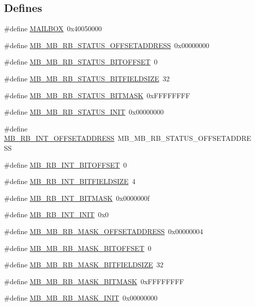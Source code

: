 \subsection*{Defines}
\begin{DoxyCompactItemize}
\item 
\#define \hyperlink{a00562_aec191881c194bbd41398484be819f3f2}{MAILBOX}~0x40050000
\item 
\#define \hyperlink{a00562_a016e3fc97e745927a8e4988dbf686809}{MB\_\-MB\_\-RB\_\-STATUS\_\-OFFSETADDRESS}~0x00000000
\item 
\#define \hyperlink{a00562_ace1cd2db5cab4873a9cac82d8118f1ff}{MB\_\-MB\_\-RB\_\-STATUS\_\-BITOFFSET}~0
\item 
\#define \hyperlink{a00562_a5b92f9745f3c6cc22f2f05050045f194}{MB\_\-MB\_\-RB\_\-STATUS\_\-BITFIELDSIZE}~32
\item 
\#define \hyperlink{a00562_a5896996a4d843251872e78064f2545c6}{MB\_\-MB\_\-RB\_\-STATUS\_\-BITMASK}~0xFFFFFFFF
\item 
\#define \hyperlink{a00562_a35f893b19cc32b14877fd398364dac68}{MB\_\-MB\_\-RB\_\-STATUS\_\-INIT}~0x00000000
\item 
\#define \hyperlink{a00562_a5d5a6e6093f1918d4912dab9e59587ce}{MB\_\-RB\_\-INT\_\-OFFSETADDRESS}~MB\_\-MB\_\-RB\_\-STATUS\_\-OFFSETADDRESS
\item 
\#define \hyperlink{a00562_a8cda520fdf27d64c2d05e48bda836f13}{MB\_\-RB\_\-INT\_\-BITOFFSET}~0
\item 
\#define \hyperlink{a00562_ab631f7c502b0888aad4f38c1d9f0347a}{MB\_\-RB\_\-INT\_\-BITFIELDSIZE}~4
\item 
\#define \hyperlink{a00562_a0266c9edf244f9ffa89a11e1272b38c9}{MB\_\-RB\_\-INT\_\-BITMASK}~0x0000000f
\item 
\#define \hyperlink{a00562_ac941645f19586ff157b674af71de443f}{MB\_\-RB\_\-INT\_\-INIT}~0x0
\item 
\#define \hyperlink{a00562_ac3530909b0997f6db0c1f9ca6efb6ac5}{MB\_\-MB\_\-RB\_\-MASK\_\-OFFSETADDRESS}~0x00000004
\item 
\#define \hyperlink{a00562_adc962ec4ed6e07508c4bb1bf9e56a932}{MB\_\-MB\_\-RB\_\-MASK\_\-BITOFFSET}~0
\item 
\#define \hyperlink{a00562_ad1c78fd5c3e9172bb30064042ee2d055}{MB\_\-MB\_\-RB\_\-MASK\_\-BITFIELDSIZE}~32
\item 
\#define \hyperlink{a00562_a0c02b645113d43765676d4c2852d9c7c}{MB\_\-MB\_\-RB\_\-MASK\_\-BITMASK}~0xFFFFFFFF
\item 
\#define \hyperlink{a00562_a5225729f954beddb3c2c5335bcfc9ec5}{MB\_\-MB\_\-RB\_\-MASK\_\-INIT}~0x00000000

\end{DoxyCompactItemize}
